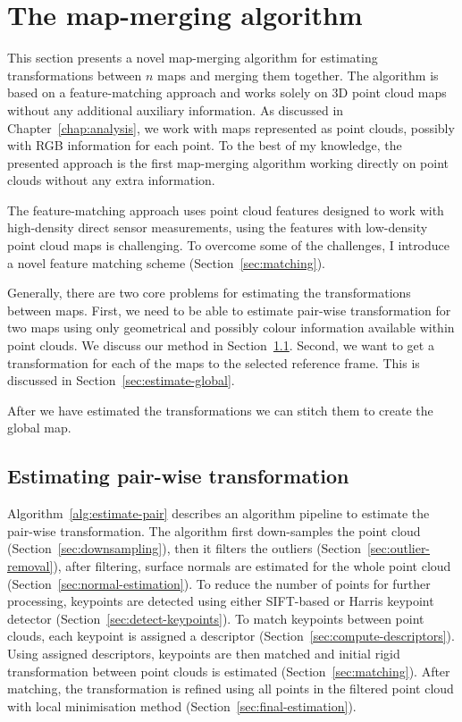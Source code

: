 \chapter{The map-merging algorithm}
\label{chap:mergingalgorithm}

This section presents a novel map-merging algorithm for estimating transformations between $n$ maps and merging them together. The algorithm is based on a feature-matching approach and works solely on \gls{3D} point cloud maps without any additional auxiliary information. As discussed in Chapter~\ref{chap:analysis}, we work with maps represented as point clouds, possibly with \gls{RGB} information for each point. To the best of my knowledge, the presented approach is the first map-merging algorithm working directly on point clouds without any extra information.

The feature-matching approach uses point cloud features designed to work with high-density direct sensor measurements, using the features with low-density point cloud maps is challenging. To overcome some of the challenges, I introduce a novel feature matching scheme (Section~\ref{sec:matching}).

Generally, there are two core problems for estimating the transformations between maps. First, we need to be able to estimate pair-wise transformation for two maps using only geometrical and possibly colour information available within point clouds. We discuss our method in Section~\ref{sec:estimate-pair-wise}. Second, we want to get a transformation for each of the maps to the selected reference frame. This is discussed in Section~\ref{sec:estimate-global}.

After we have estimated the transformations we can stitch them to create the global map.

\section{Estimating pair-wise transformation}
\label{sec:estimate-pair-wise}

Algorithm~\ref{alg:estimate-pair} describes an algorithm pipeline to estimate the pair-wise transformation. The algorithm first down-samples the point cloud (Section~\ref{sec:downsampling}), then it filters the outliers (Section~\ref{sec:outlier-removal}), after filtering, surface normals are estimated for the whole point cloud (Section~\ref{sec:normal-estimation}). To reduce the number of points for further processing, keypoints are detected using either \gls{SIFT}-based or Harris keypoint detector (Section~\ref{sec:detect-keypoints}). To match keypoints between point clouds, each keypoint is assigned a descriptor (Section~\ref{sec:compute-descriptors}). Using assigned descriptors, keypoints are then matched and initial rigid transformation between point clouds is estimated (Section~\ref{sec:matching}). After matching, the transformation is refined using all points in the filtered point cloud with local minimisation method (Section~\ref{sec:final-estimation}).


